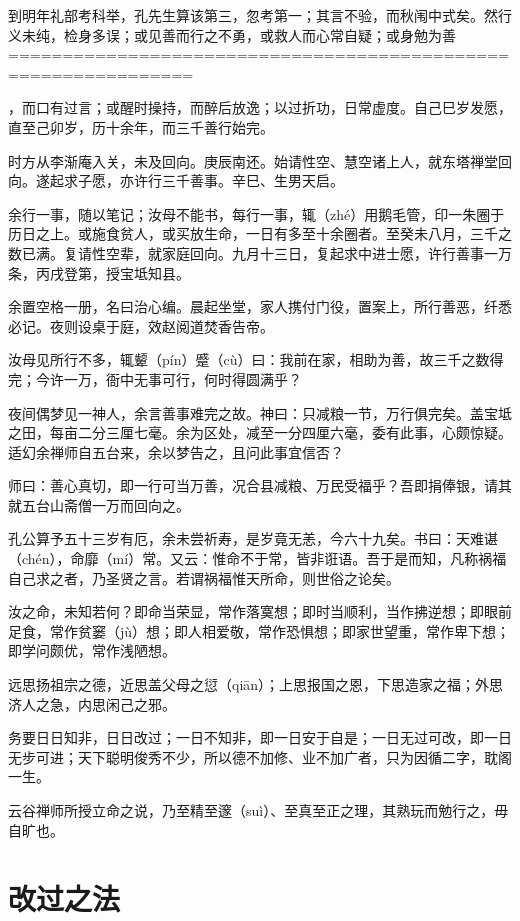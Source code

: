 \documentclass[12pt,UTF8]{ctexbook}
\begin{document}
到明年礼部考科举，孔先生算该第三，忽考第一；其言不验，而秋闱中式矣。然行义未纯，检身多误；或见善而行之不勇，或救人而心常自疑；或身勉为善===============================================================

，而口有过言；或醒时操持，而醉后放逸；以过折功，日常虚度。自己巳岁发愿，直至己卯岁，历十余年，而三千善行始完。

时方从李渐庵入关，未及回向。庚辰南还。始请性空、慧空诸上人，就东塔禅堂回向。遂起求子愿，亦许行三千善事。辛巳、生男天启。

余行一事，随以笔记；汝母不能书，每行一事，辄（zhé）用鹅毛管，印一朱圈于历日之上。或施食贫人，或买放生命，一日有多至十余圈者。至癸未八月，三千之数已满。复请性空辈，就家庭回向。九月十三日，复起求中进士愿，许行善事一万条，丙戌登第，授宝坻知县。

余置空格一册，名曰治心编。晨起坐堂，家人携付门役，置案上，所行善恶，纤悉必记。夜则设桌于庭，效赵阅道焚香告帝。

汝母见所行不多，辄颦（pín）蹙（cù）曰：我前在家，相助为善，故三千之数得完；今许一万，衙中无事可行，何时得圆满乎？

夜间偶梦见一神人，余言善事难完之故。神曰：只减粮一节，万行俱完矣。盖宝坻之田，每亩二分三厘七毫。余为区处，减至一分四厘六毫，委有此事，心颇惊疑。适幻余禅师自五台来，余以梦告之，且问此事宜信否？

师曰：善心真切，即一行可当万善，况合县减粮、万民受福乎？吾即捐俸银，请其就五台山斋僧一万而回向之。

孔公算予五十三岁有厄，余未尝祈寿，是岁竟无恙，今六十九矣。书曰：天难谌（chén），命靡（mí）常。又云：惟命不于常，皆非诳语。吾于是而知，凡称祸福自己求之者，乃圣贤之言。若谓祸福惟天所命，则世俗之论矣。

汝之命，未知若何？即命当荣显，常作落寞想；即时当顺利，当作拂逆想；即眼前足食，常作贫窭（jù）想；即人相爱敬，常作恐惧想；即家世望重，常作卑下想；即学问颇优，常作浅陋想。

远思扬祖宗之德，近思盖父母之愆（qiān）；上思报国之恩，下思造家之福；外思济人之急，内思闲己之邪。

务要日日知非，日日改过；一日不知非，即一日安于自是；一日无过可改，即一日无步可进；天下聪明俊秀不少，所以德不加修、业不加广者，只为因循二字，耽阁一生。

云谷禅师所授立命之说，乃至精至邃（suì）、至真至正之理，其熟玩而勉行之，毋自旷也。


\chapter{改过之法}
\end{document}
